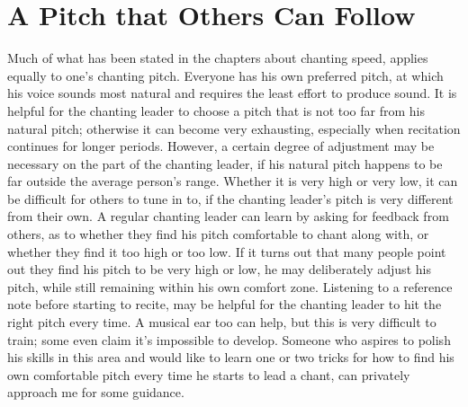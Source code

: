 \section{A Pitch that Others Can Follow}
Much of what has been stated in the chapters about chanting speed, applies equally to one’s chanting pitch. Everyone has his own preferred pitch, at which his voice sounds most natural and requires the least effort to produce sound. It is helpful for the chanting leader to choose a pitch that is not too far from his natural pitch; otherwise it can become very exhausting, especially when recitation continues for longer periods. However, a certain degree of adjustment may be necessary on the part of the chanting leader, if his natural pitch happens to be far outside the average person’s range. Whether it is very high or very low, it can be difficult for others to tune in to, if the chanting leader’s pitch is very different from their own. A regular chanting leader can learn by asking for feedback from others, as to whether they find his pitch comfortable to chant along with, or whether they find it too high or too low. If it turns out that many people point out they find his pitch to be very high or low, he may deliberately adjust his pitch, while still remaining within his own comfort zone. Listening to a reference note before starting to recite, may be helpful for the chanting leader to hit the right pitch every time. A musical ear too can help, but this is very difficult to train; some even claim it’s impossible to develop. Someone who aspires to polish his skills in this area and would like to learn one or two tricks for how to find his own comfortable pitch every time he starts to lead a chant, can privately approach me for some guidance.\\

